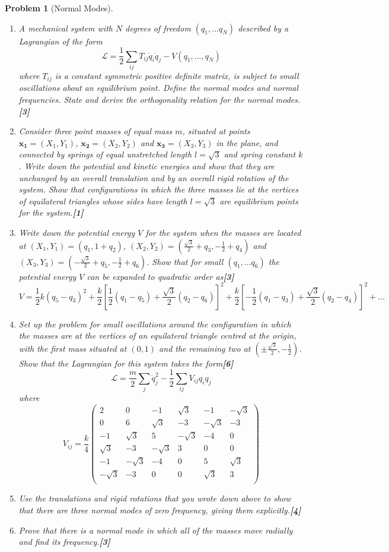 \documentclass[a4paper]{article}
\theoremstyle{new}
\newtheorem{qns}{Problem}[section]
\begin{document}
\begin{qns}[Normal Modes]\leavevmode
\begin{enumerate}[label=(\roman*)]
    \item  A mechanical system with $N$ degrees of freedom $(q_1, . . . q_N)$ described by a Lagrangian of the form
$$\mathcal{L}=\frac{1}{2}\sum_{ij}T_{ij}\dot{q}_i\dot{q}_j-V(q_1,...,q_N)$$
where $T_{ij}$ is a constant symmetric positive definite matrix, is subject to small oscillations about an equilibrium point. Define the normal modes and normal frequencies. State and derive the orthogonality relation for the normal modes.\hfill\textbf{[3]}
\item Consider three point masses of equal mass $m$, situated at points $\mathbf{x_1}=(X_1,Y_1)$,  $\mathbf{x_2}=(X_2,Y_2)$ and  $\mathbf{x_3}=(X_3,Y_3)$ in the plane, and connected by springs of equal unstretched length $l=\sqrt{3}$ and spring constant $k$. Write down the potential and kinetic energies and show that they are unchanged by an overall translation and by an overall rigid rotation of the system. Show that configurations in which the three masses lie at the vertices of equilateral triangles whose sides have length $l=\sqrt{3}$ are equilibrium points for the system.\hfill\textbf{[1]}
\item Write down the potential energy $V$ for the system when the masses are located at $(X_1,Y_1)=(q_1,1+q_2)$, $(X_2,Y_2)=(\frac{\sqrt{3}}{2}+q_3,-\frac{1}{2}+q_4)$ and $(X_3,Y_3)=(-\frac{\sqrt{3}}{2}+q_5,-\frac{1}{2}+q_6)$. Show that for small $(q_1, . . . q_6)$ the potential energy $V$ can be expanded to quadratic order as\hfill\textbf{[3]}
$$V=\frac{1}{2}k(q_5-q_3)^2+\frac{k}{2}[\frac{1}{2}(q_1-q_5)+\frac{\sqrt{3}}{2}(q_2-q_6)]^2+\frac{k}{2}[-\frac{1}{2}(q_1-q_3)+\frac{\sqrt{3}}{2}(q_2-q_4)]^2+...$$
\item Set up the problem for small oscillations around the configuration in which the masses are at the vertices of an equilateral triangle centred at the origin, with the first mass situated at $(0, 1)$ and the remaining two at $(\pm\frac{\sqrt{3}}{2},-\frac{1}{2})$. Show that the Lagrangian for this system takes the form\hfill\textbf{[6]}
$$\mathcal{L}=\frac{m}{2}\sum_j\dot{q}_j^2-\frac{1}{2}\sum_{ij}V_{ij}q_iq_j$$
where
$$V_{ij}=\frac{k}{4}\begin{pmatrix}2&0&-1&\sqrt{3}&-1&-\sqrt{3}\\0&6&\sqrt{3}&-3&-\sqrt{3}&-3\\-1&\sqrt{3}&5&-\sqrt{3}&-4&0\\\sqrt{3}&-3&-\sqrt{3}&3&0&0\\-1&-\sqrt{3}&-4&0&5&\sqrt{3}\\-\sqrt{3}&-3&0&0&\sqrt{3}&3\\\end{pmatrix}$$
\item Use the translations and rigid rotations that you wrote down above to show that there are three normal modes of zero frequency, giving them explicitly.\hfill\textbf{[4]}
\item Prove that there is a normal mode in which all of the masses move radially and find its frequency.\hfill\textbf{[3]}
\end{enumerate}
\end{qns}
\end{document}
